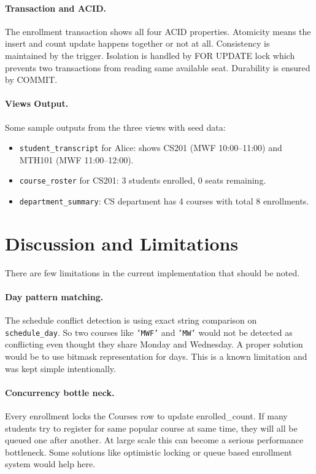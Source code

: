 \documentclass[11pt]{article}
\begin{document}
    \paragraph{Transaction and ACID.}
    The enrollment transaction shows all four ACID properties. Atomicity means the
    insert and count update happens together or not at all. Consistency is maintained
    by the trigger. Isolation is handled by FOR UPDATE lock which prevents two
    transactions from reading same available seat. Durability is ensured by COMMIT.

    \paragraph{Views Output.}
    Some sample outputs from the three views with seed data:
    \begin{itemize}
    \item \texttt{student\_transcript} for Alice: shows CS201 (MWF 10:00--11:00) and
            MTH101 (MWF 11:00--12:00).
    \item \texttt{course\_roster} for CS201: 3 students enrolled, 0 seats remaining.
    \item \texttt{department\_summary}: CS department has 4 courses with total 8 enrollments.
    \end{itemize}

    \section{Discussion and Limitations}

    There are few limitations in the current implementation that should be noted.

    \paragraph{Day pattern matching.}
    The schedule conflict detection is using exact string comparison on
    \texttt{schedule\_day}. So two courses like \texttt{'MWF'} and \texttt{'MW'} would
    not be detected as conflicting even thought they share Monday and Wednesday. A proper
    solution would be to use bitmask representation for days. This is a known limitation
    and was kept simple intentionally.

    \paragraph{Concurrency bottle neck.}
    Every enrollment locks the Courses row to update enrolled\_count. If many students
    try to register for same popular course at same time, they will all be queued one
    after another. At large scale this can become a serious performance bottleneck.
    Some solutions like optimistic locking or queue based enrollment system would help
    here.
\end{document}
